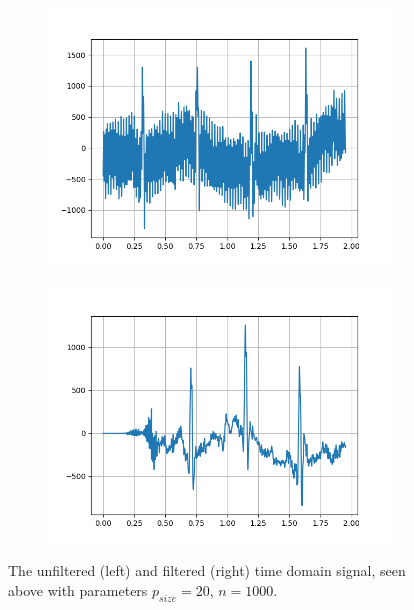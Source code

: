 \documentclass[a4paper, 11pt]{article}
\begin{document}
    \begin{figure}[h!]
        \centering  
        \begin{subfigure}[b]{0.5\linewidth}
            \graphicspath{{./wiki/}}
            \includegraphics[width=\linewidth]{TDU.png}
        \end{subfigure}%
        \begin{subfigure}[b]{0.5\linewidth}
            \graphicspath{{./wiki/}}
            \includegraphics[width=\linewidth]{TDF.png}
        \end{subfigure}
        \caption{The unfiltered (left) and filtered (right) time domain signal, 
        seen above with parameters $p_{size} = 20$, $n = 1000$.}
        \label{Fig:result_2}
    \end{figure}
\end{document}

